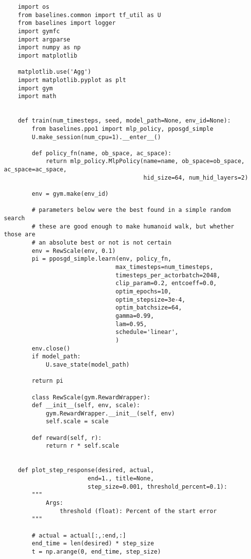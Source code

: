 \begin{verbatim}
    import os
    from baselines.common import tf_util as U
    from baselines import logger
    import gymfc
    import argparse
    import numpy as np
    import matplotlib

    matplotlib.use('Agg')
    import matplotlib.pyplot as plt
    import gym
    import math


    def train(num_timesteps, seed, model_path=None, env_id=None):
        from baselines.ppo1 import mlp_policy, pposgd_simple
        U.make_session(num_cpu=1).__enter__()

        def policy_fn(name, ob_space, ac_space):
            return mlp_policy.MlpPolicy(name=name, ob_space=ob_space, ac_space=ac_space,
                                        hid_size=64, num_hid_layers=2)

        env = gym.make(env_id)

        # parameters below were the best found in a simple random search
        # these are good enough to make humanoid walk, but whether those are
        # an absolute best or not is not certain
        env = RewScale(env, 0.1)
        pi = pposgd_simple.learn(env, policy_fn,
                                max_timesteps=num_timesteps,
                                timesteps_per_actorbatch=2048,
                                clip_param=0.2, entcoeff=0.0,
                                optim_epochs=10,
                                optim_stepsize=3e-4,
                                optim_batchsize=64,
                                gamma=0.99,
                                lam=0.95,
                                schedule='linear',
                                )
        env.close()
        if model_path:
            U.save_state(model_path)

        return pi

        class RewScale(gym.RewardWrapper):
        def __init__(self, env, scale):
            gym.RewardWrapper.__init__(self, env)
            self.scale = scale

        def reward(self, r):
            return r * self.scale


    def plot_step_response(desired, actual,
                        end=1., title=None,
                        step_size=0.001, threshold_percent=0.1):
        """
            Args:
                threshold (float): Percent of the start error
        """

        # actual = actual[:,:end,:]
        end_time = len(desired) * step_size
        t = np.arange(0, end_time, step_size)


\end{verbatim}
